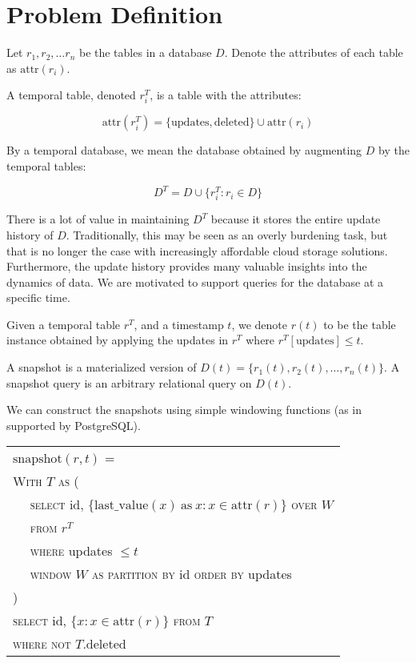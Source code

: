 \newcommand{\attr}{\mathrm{attr}}

\section{Problem Definition}

\begin{definition}
    Let $r_1, r_2, \dots r_n$ be the tables
    in a database $D$.  Denote the attributes
    of each table as $\attr(r_i)$.

    A temporal table, denoted $r_i^T$, is
    a table with the attributes:

    $$\attr(r_i^T) = \{\mathrm{updates}, \mathrm{deleted}\} \cup \attr(r_i)$$

    By a temporal database, we mean the database obtained by augmenting
    $D$ by the temporal tables:

    $$ D^T = D \cup \{r_i^T: r_i\in D\} $$
\end{definition}

There is a lot of value in maintaining $D^T$ because it stores the entire update
history of $D$.  Traditionally, this may be seen as an overly burdening task,
but that is no longer the case with increasingly affordable cloud storage
solutions.  Furthermore, the update history provides many valuable insights into
the dynamics of data. We are motivated to support queries for the database at a
specific time.

\begin{definition}
    Given a temporal table $r^T$, and a timestamp $t$, we denote
    $r(t)$ to be the table instance obtained by applying the updates
    in $r^T$ where $r^T[\mathrm{updates}] \leq t$.

    A snapshot is a materialized version of $D(t) = \{r_1(t), r_2(t), \dots,
    r_n(t)\}$.  A snapshot query is an arbitrary relational query on $D(t)$.
\end{definition}

We can construct the snapshots using simple windowing functions (as in supported
by PostgreSQL).


\vspace{1em}

{\small
\begin{tabular}{|l|} \hline
    $\mathrm{snapshot}(r, t)$ = \\
    \verb|| \textsc{With} $T$ \textsc{as} ( \\
    \verb|  | \textsc{select} id, $\{\mathrm{last\_value}(x) \mathrm{\ as\ } x:
    x\in\attr(r)\}$ \textsc{over} $W$ \\
    \verb|  | \textsc{from} $r^T$ \\
    \verb|  | \textsc{where} updates $\leq t$ \\
    \verb|  | \textsc{window} $W$ \textsc{as} 
              \textsc{partition by} id \textsc{order by} updates\\
    \verb|| ) \\
    \verb|| \textsc{select} id, $\{x: x\in\attr(r)\}$ \textsc{from} $T$ \\
    \verb|| \textsc{where not} $T.$deleted \\ \hline
\end{tabular}
}

